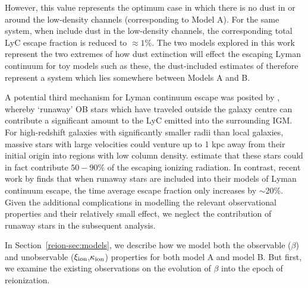 However, this value represents the optimum case in which there is no dust in or around the low-density channels (corresponding to Model A). For the same system, when \citet{Borthakur:2014bz} include dust in the low-density channels, the corresponding total LyC escape fraction is reduced to $\approx 1\%$. The two models explored in this work represent the two extremes of how dust extinction will effect the escaping Lyman continuum for toy models such as these, the dust-included estimates of \citet{Borthakur:2014bz} therefore represent a system which lies somewhere between Models A and B. 

A potential third mechanism for Lyman continuum escape was posited by \citet{Conroy:2012fc}, whereby `runaway' OB stars which have traveled outside the galaxy centre can contribute a significant amount to the LyC emitted into the surrounding IGM. For high-redshift galaxies with significantly smaller radii than local galaxies, massive stars with large velocities could venture up to 1 kpc away from their initial origin into regions with low column density. \citet{Conroy:2012fc} estimate that these stars could in fact contribute $50 - 90\%$ of the escaping ionizing radiation. In contrast, recent work by \citet{Kimm:2014gv} finds that when runaway stars are included into their models of Lyman continuum escape, the time average escape fraction only increases by $\sim20\%$. Given the additional complications in modelling the relevant observational properties and their relatively small effect, we neglect the contribution of runaway stars in the subsequent analysis. 

In Section~\ref{reion-sec:models}, we describe how we model both the observable ($\beta$) and unobservable ($\xi_{\rm{ion}}$,$\kappa_{\rm{ion}}$) properties for both model A and model B. But first, we examine the existing observations on the evolution of $\beta$ into the epoch of reionization.

